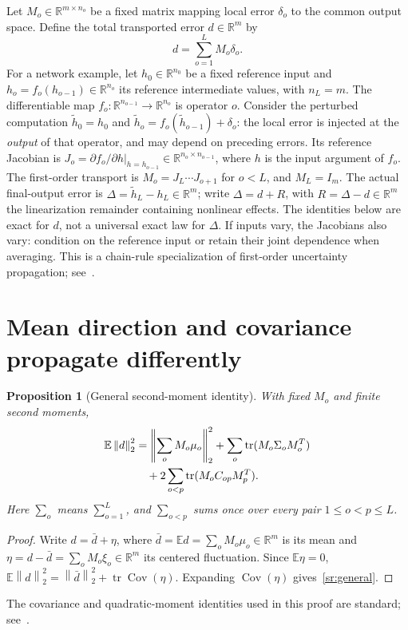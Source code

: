 \documentclass[10pt,a4paper]{article}
\newcommand{\R}{\mathbb{R}}
\newcommand{\E}{\mathbb{E}}
\newcommand{\norm}[1]{\left\lVert#1\right\rVert}
\DeclareMathOperator{\tr}{tr}
\DeclareMathOperator{\Cov}{Cov}
\newtheorem{proposition}{Proposition}
\begin{document}
Let $M_o\in\R^{m\times n_o}$ be a fixed matrix mapping local error $\delta_o$
to the common output space. Define the total transported error $d\in\R^m$ by
\begin{equation}
 d=\sum_{o=1}^L M_o\delta_o.
 \label{sr:transport}
\end{equation}
For a network example, let $h_0\in\R^{n_0}$ be a fixed reference input and
$h_o=f_o(h_{o-1})\in\R^{n_o}$ its reference intermediate values, with
$n_L=m$. The differentiable map $f_o:\R^{n_{o-1}}\to\R^{n_o}$ is operator
$o$. Consider the perturbed computation
$\widetilde h_0=h_0$ and
$\widetilde h_o=f_o(\widetilde h_{o-1})+\delta_o$:
the local error is injected at the \emph{output} of that operator, and may
depend on preceding errors. Its reference Jacobian is
$J_o=\left.\partial f_o/\partial h\right|_{h=h_{o-1}}
\in\R^{n_o\times n_{o-1}}$, where $h$ is the input argument of $f_o$.
The first-order transport is $M_o=J_L\cdots J_{o+1}$ for $o<L$, and
$M_L=I_m$. The actual final-output error is
$\Delta=\widetilde h_L-h_L\in\R^m$; write $\Delta=d+R$, with
$R=\Delta-d\in\R^m$ the linearization remainder containing nonlinear effects.
The identities below are exact for $d$, not a universal exact law for $\Delta$.
If inputs vary, the Jacobians also vary: condition on the reference input or
retain their joint dependence when averaging.
This is a chain-rule specialization of first-order uncertainty propagation;
see~\cite[Sections 5.1--5.2, Eqs.~(10), (13)]{jcgm2008gum}.

\section{Mean direction and covariance propagate differently}
\begin{proposition}[General second-moment identity]
With fixed $M_o$ and finite second moments,
\begin{align}
 \E\norm{d}_2^2
 &=\left\lVert\sum_o M_o\mu_o\right\rVert_2^2
   +\sum_o\tr(M_o\Sigma_o M_o^T) \notag\\
 &\quad+2\sum_{o<p}\tr(M_o C_{op}M_p^T).
 \label{sr:general}
\end{align}
Here $\sum_o$ means $\sum_{o=1}^L$, and $\sum_{o<p}$ sums once over every
pair $1\leq o<p\leq L$.
\end{proposition}
\begin{proof}
Write $d=\bar d+\eta$, where $\bar d=\E d=\sum_oM_o\mu_o\in\R^m$ is its
mean and $\eta=d-\bar d=\sum_oM_o\xi_o\in\R^m$ its centered fluctuation.
Since $\E\eta=0$,
$\E\norm{d}_2^2=\norm{\bar d}_2^2+\tr\Cov(\eta)$.
Expanding $\Cov(\eta)$ gives~\eqref{sr:general}.
\end{proof}
The covariance and quadratic-moment identities used in this proof are standard;
see~\cite[Section 6.2, Eqs.~(313)--(314), (327)--(329)]{petersen2012matrixcookbook}.
\end{document}
